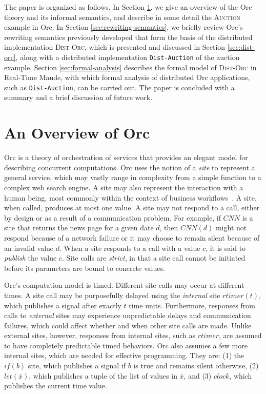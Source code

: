 \documentclass{eptcs}
\begin{document}
The paper is organized as follows. In Section \ref{sec:orc}, we give an overview of the Orc theory and its informal semantics, and describe in some detail the \textsc{Auction} example in Orc. In Section \ref{sec:rewriting-semantics}, we briefly review Orc's rewriting semantics previously developed that form the basis of the distributed implementation \textsc{Dist-Orc}, which is presented and discussed in Section \ref{sec:dist-orc}, along with a distributed implementation \texttt{Dist-Auction} of the auction example. Section \ref{sec:formal-analysis} describes the formal model of \textsc{Dist-Orc} in Real-Time Maude, with which formal analysis of distributed Orc applications, such as \texttt{Dist-Auction}, can be carried out. The paper is concluded with a summary and a brief discussion of future work.


\section{An Overview of Orc} \label{sec:orc}

Orc is a theory of orchestration of services that provides an elegant model for describing concurrent computations. Orc uses the notion of a \emph{site} to represent a general service, which may vastly range in complexity from a simple function to a complex web search engine. A site may also represent the interaction with a human being, most commonly within the context of business workflows~\cite{Aalstetal2003}. A site, when called, produces at most one value. A site may not respond to a call, either by design or as a result of a communication problem. For example, if $\mathit{CNN}$ is a site that returns the news page for a given date $d$, then $\mathit{CNN}(d)$ might not respond because of a network failure or it may choose to remain silent because of an invalid value $d$. When a site responds to a call with a value $c$, it is said to \emph{publish} the value $c$. Site calls are \emph{strict}, in that a site 
call cannot be initiated before its parameters are bound to concrete values.

Orc's computation model is timed. Different site calls may occur at different times. A site call may be purposefully delayed using the \emph{internal} site $\mathit{rtimer}(t)$, which publishes a signal after exactly $t$ time units. Furthermore, responses from calls to \emph{external} sites may experience unpredictable delays and communication failures, which could affect whether and when other site calls are made. Unlike external sites, however, responses from internal sites, such as $\mathit{rtimer}$, are assumed to have completely predictable timed behaviors. Orc also assumes a few more internal sites, which are needed for effective programming. They are: (1) the $\mathit{if}(b)$ site, which publishes a signal if $b$ is true and remains silent otherwise, (2) $let(\bar{x})$, which publishes a tuple of the list of values in $\bar{x}$, and (3) $\mathit{clock}$, which publishes the current time value. 
\end{document}
